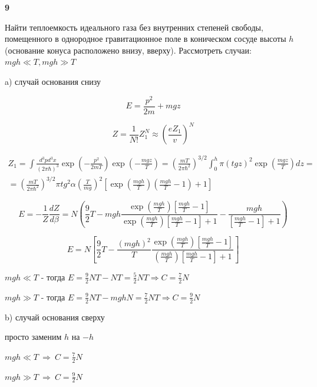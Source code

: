\documentclass[a4paper,12pt]{article} %
\begin{document}
\begin{ttask}\textbf{9}

Найти теплоемкость идеального газа без внутренних степеней свободы, помещенного в однородное гравитационное поле в коническом сосуде высоты $ h $ (основание конуса расположено внизу, вверху). Рассмотреть случаи:
$ m g h \ll T, m g h \gg T $


a) случай основания снизу

\[ E=\frac{p^{2}}{2 m}+mg z \]


\[ Z=\frac{1}{N!} Z_{1}^{N} \approx
\left(\frac{e Z_{1}}{v}\right)^{N} \]

\begin{multline}
 Z_1= \int \frac{d^3 p d^3 x}{(2\pi \hbar)^3}\exp \left(-\frac{p^2}{2mT}\right) \exp \left(-\frac{mgz}{T}\right)= \left(\frac{mT}{2\pi \hbar^2}\right)^{3/2}\int_{0}^{h} \pi ( tg z)^2\exp \left(\frac{mgz}{T}\right) dz=\\
=\left(\frac{mT}{2\pi \hbar^2}\right)^{3/2} 
\pi tg^2 \alpha \left(\frac{T}{mg}\right)^2
\left[ \exp\left(\frac{m gh}{T}\right)
\left(\frac{m g h}{T}-1 \right)+1\right]
\end{multline}

\[ E=-\frac{1}{Z} \frac{d Z}{d \beta}=N\left(\frac{9}{2} T- 
m g h\frac{\exp\left( \frac{mgh}{T}\right)\left[\frac{mgh}{T}-1\right]}
{\exp\left( \frac{mgh}{T}\right) \left[\frac{mgh}{T}-1\right]+1}-
\frac{mgh}{\left[\frac{mgh}{T}-1\right]+1}\right) \]

\[ E=N\left[\frac{9}{2}T -\frac{(mgh)^2}{T} \frac{\exp \left( \frac{mgh}{T}\right)\left[\frac{mgh}{T}-1\right] }{\left( \frac{mgh}{T}\right)\left[\frac{mgh}{T}-1\right]+1}\right] \]



$m g h\ll T$ - тогда $E=\frac{9}{2} N T-N T=\frac{5}{2} N T \Rightarrow C=\frac{7}{2} N$


$m g h\gg T$ - тогда $E=\frac{9}{2} N T-mghN=\frac{7}{2} N T \Rightarrow C=\frac{9}{2} N$




b) случай основания сверху

просто заменим $ h$ на $ -h $




$m g h\ll T \ \Rightarrow \ C=\frac{7}{2} N$


$m g h\gg T \ \Rightarrow \ C=\frac{9}{2} N$




\end{ttask}
\end{document}
